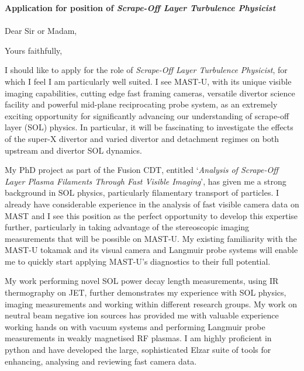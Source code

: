 \documentclass[11pt,a4paper,sans]{moderncv}        %
\begin{document}
\date{\today}
\opening{\textbf{Application for position of \textit{Scrape-Off Layer Turbulence Physicist}}\\~\\
Dear Sir or Madam,}
\closing{Yours faithfully,}
\makelettertitle

I should like to apply for the role of \textit{Scrape-Off Layer Turbulence Physicist}, for which I feel I am particularly well suited.
I see MAST-U, with its unique visible imaging capabilities, cutting edge fast framing cameras, versatile divertor science facility and powerful mid-plane reciprocating probe system, as an extremely exciting opportunity for significantly advancing our understanding of scrape-off layer (SOL) physics.
In particular, it will be fascinating to investigate the effects of the super-X divertor and varied divertor and detachment regimes on both upstream and divertor SOL dynamics.

My PhD project as part of the Fusion CDT, entitled `\textit{Analysis of Scrape-Off Layer Plasma Filaments Through Fast Visible Imaging}', has given me a strong background in SOL physics, particularly filamentary transport of particles.
I already have considerable experience in the analysis of fast visible camera data on MAST and I see this position as the perfect opportunity to develop this expertise further, particularly in taking advantage of the stereoscopic imaging measurements that will be possible on MAST-U.
My existing familiarity with the MAST-U tokamak and its visual camera and Langmuir probe systems will enable me to quickly start applying MAST-U's diagnostics to their full potential.

My work performing novel SOL power decay length measurements, using IR thermography on JET, further demonstrates my experience with SOL physics, imaging measurements and working within different research groups.
My work on neutral beam negative ion sources has provided me with valuable experience working hands on with vacuum systems and performing Langmuir probe measurements in weakly magnetised RF plasmas.
I am highly proficient in python and have developed the large, sophisticated Elzar suite of tools for enhancing, analysing and reviewing fast camera data.
\end{document}
